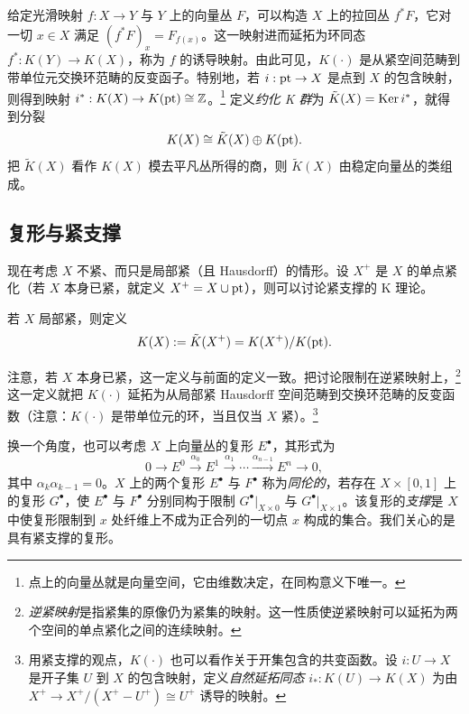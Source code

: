 给定光滑映射 $f:X\to Y$ 与 $Y$ 上的向量丛 $F$，可以构造 $X$ 上的拉回丛 $f^*F$，它对一切 $x\in X$ 满足 $(f^*F)_x=F_{f(x)}$。这一映射进而延拓为环同态 $f^*:K(Y)\to K(X)$，称为 $f$ 的诱导映射。由此可见，$K(\cdot)$ 是从紧空间范畴到带单位元交换环范畴的反变函子。特别地，若 $i:\mathrm{pt}\to X$ 是点到 $X$ 的包含映射，则得到映射 $i^*:K(X)\to K(\mathrm{pt})\cong\mathbb{Z}$。\footnote{点上的向量丛就是向量空间，它由维数决定，在同构意义下唯一。} 定义\emph{约化 K 群}为 $\tilde K(X)=\operatorname{Ker} i^*$，就得到分裂
\[
K(X)\cong\tilde K(X)\oplus K(\mathrm{pt}).
\]
把 $\tilde K(X)$ 看作 $K(X)$ 模去平凡丛所得的商，则 $\tilde K(X)$ 由稳定向量丛的类组成。



\subsection{复形与紧支撑}

现在考虑 $X$ 不紧、而只是局部紧（且 Hausdorff）的情形。设 $X^+$ 是 $X$ 的单点紧化（若 $X$ 本身已紧，就定义 $X^+=X\cup\mathrm{pt}$），则可以讨论紧支撑的 K 理论。

\begin{definition}
若 $X$ 局部紧，则定义
\[
K(X):=\tilde K(X^+)=K(X^+)/K(\mathrm{pt}).
\]
\end{definition}

注意，若 $X$ 本身已紧，这一定义与前面的定义一致。把讨论限制在逆紧映射上，\footnote{\emph{逆紧映射}是指紧集的原像仍为紧集的映射。这一性质使逆紧映射可以延拓为两个空间的单点紧化之间的连续映射。} 这一定义就把 $K(\cdot)$ 延拓为从局部紧 Hausdorff 空间范畴到交换环范畴的反变函数（注意：$K(\cdot)$ 是带单位元的环，当且仅当 $X$ 紧）。\footnote{用紧支撑的观点，$K(\cdot)$ 也可以看作关于开集包含的共变函数。设 $i:U\to X$ 是开子集 $U$ 到 $X$ 的包含映射，定义\emph{自然延拓同态} $i_*:K(U)\to K(X)$ 为由 $X^+\to X^+/(X^+-U^+)\cong U^+$ 诱导的映射。}

换一个角度，也可以考虑 $X$ 上向量丛的复形 $E^\bullet$，其形式为
\[
0\to E^0\xrightarrow{\alpha_0}E^1\xrightarrow{\alpha_1}\cdots
\xrightarrow{\alpha_{n-1}}E^n\to0,
\]
其中 $\alpha_k\alpha_{k-1}=0$。$X$ 上的两个复形 $E^\bullet$ 与 $F^\bullet$ 称为\emph{同伦的}，若存在 $X\times[0,1]$ 上的复形 $G^\bullet$，使 $E^\bullet$ 与 $F^\bullet$ 分别同构于限制 $G^\bullet|_{X\times0}$ 与 $G^\bullet|_{X\times1}$。该复形的\emph{支撑}是 $X$ 中使复形限制到 $x$ 处纤维上不成为正合列的一切点 $x$ 构成的集合。我们关心的是具有紧支撑的复形。

